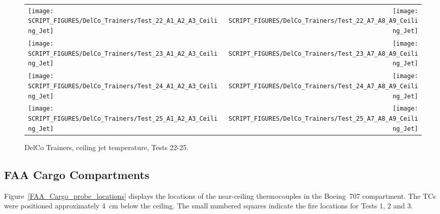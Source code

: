 \begin{figure}[p]
\begin{tabular*}{\textwidth}{l@{\extracolsep{\fill}}r}
\texttt{[image: SCRIPT\_FIGURES/DelCo\_Trainers/Test\_22\_A1\_A2\_A3\_Ceiling\_Jet]} &
\texttt{[image: SCRIPT\_FIGURES/DelCo\_Trainers/Test\_22\_A7\_A8\_A9\_Ceiling\_Jet]} \\
\texttt{[image: SCRIPT\_FIGURES/DelCo\_Trainers/Test\_23\_A1\_A2\_A3\_Ceiling\_Jet]} &
\texttt{[image: SCRIPT\_FIGURES/DelCo\_Trainers/Test\_23\_A7\_A8\_A9\_Ceiling\_Jet]} \\
\texttt{[image: SCRIPT\_FIGURES/DelCo\_Trainers/Test\_24\_A1\_A2\_A3\_Ceiling\_Jet]} &
\texttt{[image: SCRIPT\_FIGURES/DelCo\_Trainers/Test\_24\_A7\_A8\_A9\_Ceiling\_Jet]} \\
\texttt{[image: SCRIPT\_FIGURES/DelCo\_Trainers/Test\_25\_A1\_A2\_A3\_Ceiling\_Jet]} &
\texttt{[image: SCRIPT\_FIGURES/DelCo\_Trainers/Test\_25\_A7\_A8\_A9\_Ceiling\_Jet]}
\end{tabular*}
\caption[DelCo Trainers, ceiling jet temperature, Tests 22-25]
{DelCo Trainers, ceiling jet temperature, Tests 22-25.}
\label{DelCo_Ceiling_Jet_3}
\end{figure}

\clearpage

\subsection{FAA Cargo Compartments}

Figure~\ref{FAA_Cargo_probe_locations} displays the locations of the near-ceiling thermocouples in the Boeing~707 compartment. The TCs were positioned approximately 4~cm below the ceiling. The small numbered squares indicate the fire locations for Tests 1, 2 and 3.


